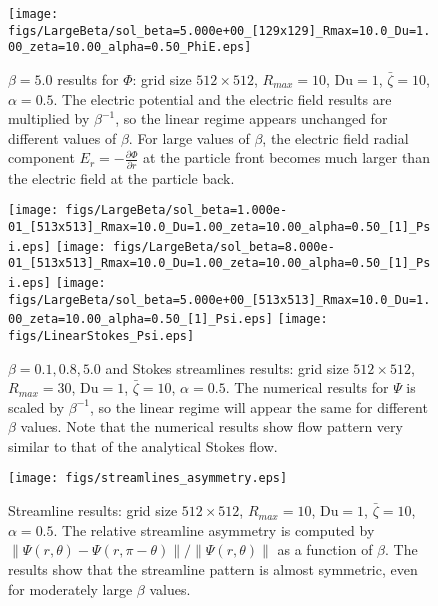 \documentclass[MSc,beforeExam]{iitcsthesis}
\newcommand{\deriv}[2]{\frac{\partial #1}{\partial #2}}
\newcommand\Du{\text{Du}}
\begin{document}
\begin{figure}
    \begin{center}
    \texttt{[image: figs/LargeBeta/sol\_beta=5.000e+00\_[129x129]\_Rmax=10.0\_Du=1.00\_zeta=10.00\_alpha=0.50\_PhiE.eps]}
        \caption[$\beta = 5.0$ results for $\varPhi$]
        {$\beta = 5.0$ results for $\varPhi$:
        grid size $512 \times 512$, $R_{max} = 10$, $\Du = 1$, $\bar\zeta = 10$, $\alpha = 0.5$.
        The electric potential and the electric field results are multiplied by $\beta^{-1}$,
	    so the linear regime appears unchanged for different values of $\beta$.
	    For large values of $\beta$, the electric field radial component $E_r = -\deriv{\varPhi}{r}$
	    at the particle front becomes much larger than the electric field at the particle back.
		}
	    \label{fig:LargeBeta_Phi3}
    \end{center}
\end{figure}

\begin{figure}
    \begin{center}
    \texttt{[image: figs/LargeBeta/sol\_beta=1.000e-01\_[513x513]\_Rmax=10.0\_Du=1.00\_zeta=10.00\_alpha=0.50\_[1]\_Psi.eps]}
    \texttt{[image: figs/LargeBeta/sol\_beta=8.000e-01\_[513x513]\_Rmax=10.0\_Du=1.00\_zeta=10.00\_alpha=0.50\_[1]\_Psi.eps]}
    \texttt{[image: figs/LargeBeta/sol\_beta=5.000e+00\_[513x513]\_Rmax=10.0\_Du=1.00\_zeta=10.00\_alpha=0.50\_[1]\_Psi.eps]}
    \texttt{[image: figs/LinearStokes\_Psi.eps]}
        \caption[Streamfunction results]
        {$\beta = 0.1, 0.8, 5.0$ and Stokes streamlines results: grid size $512 \times 512$, 
        $R_{max} = 30$, $\Du = 1$, $\bar\zeta = 10$, $\alpha = 0.5$.
        The numerical results for $\Psi$ is scaled by $\beta^{-1}$, so the linear regime
        will appear the same for different $\beta$ values.
        Note that the numerical results show 
        flow pattern very similar to that of the analytical Stokes flow.}
	    \label{fig:LargeBeta_Psi}	    
    \end{center}
\end{figure}

\begin{figure}
    \begin{center}
    \texttt{[image: figs/streamlines\_asymmetry.eps]}
        \caption[Streamfunction asymmetry]
        {Streamline results: grid size $512 \times 512$, 
        $R_{max} = 10$, $\Du = 1$, $\bar\zeta = 10$, $\alpha = 0.5$.
        The relative streamline asymmetry is computed by 
        $\|\Psi(r, \theta) - \Psi(r, \pi-\theta)\|/\|\Psi(r, \theta)\|$
        as a function of $\beta$. The results show that the streamline pattern is almost 
        symmetric, even for moderately large $\beta$ values.}
	    \label{fig:LargeBeta_PsiAsymm}	    
    \end{center}
\end{figure}
\end{document}
